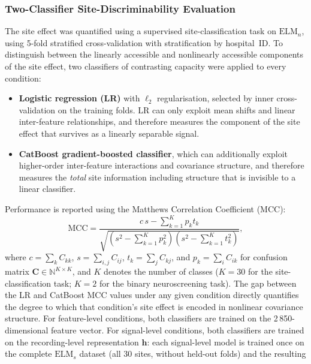 \documentclass[preprint,12pt]{elsarticle}
\begin{document}
\subsubsection{Two-Classifier Site-Discriminability Evaluation}
\label{subsubsec:two_classifier}
The site effect was quantified using a supervised site-classification
task on $\mathrm{ELM}_n$, using 5-fold stratified cross-validation
with stratification by hospital~ID.
To distinguish between the linearly accessible and nonlinearly
accessible components of the site effect, two classifiers of
contrasting capacity were applied to every condition:
\begin{itemize}
  \item \textbf{Logistic regression (LR)} with $\ell_2$
        regularisation, selected by inner cross-validation on the
        training folds.
        LR can only exploit mean shifts and linear inter-feature
        relationships, and therefore measures the component of the
        site effect that survives as a linearly separable signal.
  \item \textbf{CatBoost gradient-boosted classifier}, which can
        additionally exploit higher-order inter-feature interactions
        and covariance structure, and therefore measures the
        \emph{total} site information including structure that is
        invisible to a linear classifier.
\end{itemize}
Performance is reported using the Matthews Correlation Coefficient
(MCC):
\begin{equation}
  \mathrm{MCC} = \frac{c\,s - \sum_{k=1}^{K} p_k t_k}
    {\sqrt{\!\left(s^2 - \sum_{k=1}^{K} p_k^2\right)
           \!\left(s^2 - \sum_{k=1}^{K} t_k^2\right)}},
  \label{eq:mcc}
\end{equation}
where $c = \sum_k C_{kk}$, $s = \sum_{i,j} C_{ij}$,
$t_k = \sum_j C_{kj}$, and $p_k = \sum_i C_{ik}$ for confusion
matrix $\mathbf{C} \in \mathbb{N}^{K \times K}$, and $K$ denotes
the number of classes ($K = 30$ for the site-classification task;
$K = 2$ for the binary neuroscreening task).
The gap between the LR and CatBoost MCC values under any given
condition directly quantifies the degree to which that condition's
site effect is encoded in nonlinear covariance structure.
For feature-level conditions, both classifiers are trained on the
2\,850-dimensional feature vector.
For signal-level conditions, both classifiers are trained on the
recording-level representation $\mathbf{h}$: each signal-level
model is trained once on the complete $\mathrm{ELM}_s$ dataset
(all 30 sites, without held-out folds) and the resulting
\end{document}
